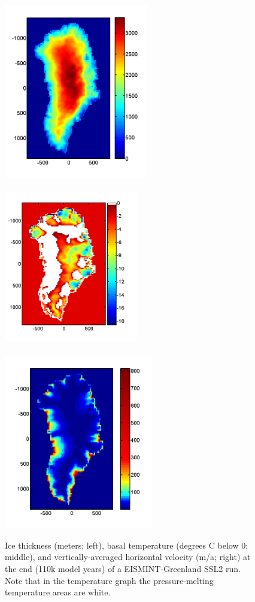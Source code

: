 \documentclass[11pt,final]{amsart}
\begin{document}
\begin{figure}[ht]
\mbox{\phantom{|}\hspace{-1.0in}\includegraphics[height=3.0in,keepaspectratio=true]{greenH_SSL2}\,\includegraphics[height=3.0in,width=2.3in]{greenTpa_SSL2}\,\includegraphics[height=3.0in,keepaspectratio=true]{greencbar_SSL2}}
\caption{Ice thickness (meters; left), basal temperature (degrees C below 0; middle), and vertically-averaged horizontal velocity (m/a; right) at the end (110k model years) of a EISMINT-Greenland SSL2 run.  Note that in the temperature graph the pressure-melting temperature areas are white.}
\label{fig:ssl2thickTpa}
\end{figure}
\end{document}
